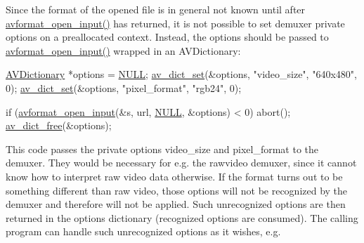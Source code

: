 Since the format of the opened file is in general not known until after \hyperlink{group__lavf__decoding_ga10a404346c646e4ab58f4ed798baca32}{avformat\+\_\+open\+\_\+input()} has returned, it is not possible to set demuxer private options on a preallocated context. Instead, the options should be passed to \hyperlink{group__lavf__decoding_ga10a404346c646e4ab58f4ed798baca32}{avformat\+\_\+open\+\_\+input()} wrapped in an A\+V\+Dictionary\+: 
\begin{DoxyCode}
\hyperlink{group__lavu__dict_ga1d7cc0833bee918994a600556410315f}{AVDictionary} *options = \hyperlink{getopt1_8c_a070d2ce7b6bb7e5c05602aa8c308d0c4}{NULL};
\hyperlink{group__lavu__dict_ga8d9c2de72b310cef8e6a28c9cd3acbbe}{av\_dict\_set}(&options, \textcolor{stringliteral}{"video\_size"}, \textcolor{stringliteral}{"640x480"}, 0);
\hyperlink{group__lavu__dict_ga8d9c2de72b310cef8e6a28c9cd3acbbe}{av\_dict\_set}(&options, \textcolor{stringliteral}{"pixel\_format"}, \textcolor{stringliteral}{"rgb24"}, 0);

\textcolor{keywordflow}{if} (\hyperlink{group__lavf__decoding_ga10a404346c646e4ab58f4ed798baca32}{avformat\_open\_input}(&s, url, \hyperlink{getopt1_8c_a070d2ce7b6bb7e5c05602aa8c308d0c4}{NULL}, &options) < 0)
    abort();
\hyperlink{group__lavu__dict_ga1bafd682b1fbb90e48a4cc3814b820f7}{av\_dict\_free}(&options);
\end{DoxyCode}
 This code passes the private options \textquotesingle{}video\+\_\+size\textquotesingle{} and \textquotesingle{}pixel\+\_\+format\textquotesingle{} to the demuxer. They would be necessary for e.\+g. the rawvideo demuxer, since it cannot know how to interpret raw video data otherwise. If the format turns out to be something different than raw video, those options will not be recognized by the demuxer and therefore will not be applied. Such unrecognized options are then returned in the options dictionary (recognized options are consumed). The calling program can handle such unrecognized options as it wishes, e.\+g. 


